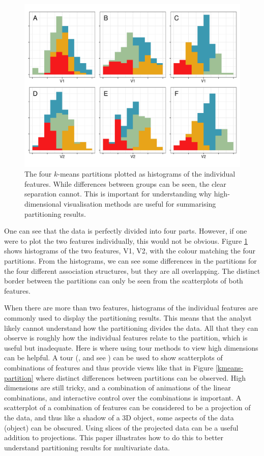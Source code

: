\documentclass[article]{ajs}
\begin{document}
\begin{figure}[ht]
\centerline{\includegraphics[width=1\textwidth]{images/intro2.pdf}}
\caption{The four $k$-means partitions plotted as histograms of the individual features. While differences between groups can be seen, the clear separation cannot. This is important for understanding why high-dimensional visualisation methods are useful for summarising partitioning results.}
\label{kmeans-histogram}
\end{figure}

One can see that the data is perfectly divided into four parts. However, if one were to plot the two features individually, this would not be obvious. Figure \ref{kmeans-histogram} shows histograms of the two features, V1, V2, with the colour matching the four partitions. From the histograms, we can see some differences in the partitions for the four different association structures, but they are all overlapping. The distinct border between the partitions can only be seen from the scatterplots of both features. 

When there are more than two features, histograms of the individual features are commonly used to display the partitioning results. This means that the analyst likely cannot understand how the partitioning divides the data. All that they can observe is roughly how the individual features relate to the partition, which is useful but inadequate. Here is where using tour methods to view high dimensions can be helpful. A tour (\cite{Asimov1985-xr}, and see \cite{lee2022}) can be used to show scatterplots of combinations of features and thus provide views like that in Figure \ref{kmeans-partition} where distinct differences between partitions can be observed. High dimensions are still tricky, and a combination of animations of the linear combinations, and interactive control \citep{cook_manual_1997, laa2023new} over the combinations is important. A scatterplot of a combination of features can be considered to be a projection of the data, and thus like a shadow of a 3D object, some aspects of the data (object) can be obscured. Using slices of the projected data \citep{Laa2020} can be a useful addition to projections. This paper illustrates how to do this to better understand partitioning results for multivariate data.
\end{document}
